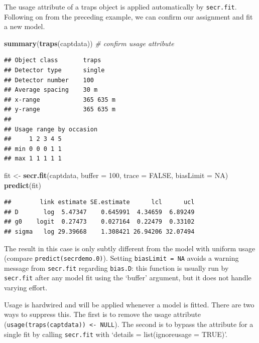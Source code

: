 \documentclass[
]{book}
\newenvironment{Shaded}{\begin{snugshade}}{\end{snugshade}}
\newcommand{\AttributeTok}[1]{\textcolor[rgb]{0.13,0.29,0.53}{#1}}
\newcommand{\CommentTok}[1]{\textcolor[rgb]{0.56,0.35,0.01}{\textit{#1}}}
\newcommand{\ConstantTok}[1]{\textcolor[rgb]{0.56,0.35,0.01}{#1}}
\newcommand{\DecValTok}[1]{\textcolor[rgb]{0.00,0.00,0.81}{#1}}
\newcommand{\FunctionTok}[1]{\textcolor[rgb]{0.13,0.29,0.53}{\textbf{#1}}}
\newcommand{\NormalTok}[1]{#1}
\newcommand{\OtherTok}[1]{\textcolor[rgb]{0.56,0.35,0.01}{#1}}
\begin{document}
The usage attribute of a traps object is applied automatically by \texttt{secr.fit}. Following on from the preceding example, we can confirm our assignment and fit a new model.

\begin{Shaded}
\begin{Highlighting}[]
\FunctionTok{summary}\NormalTok{(}\FunctionTok{traps}\NormalTok{(captdata))    }\CommentTok{\# confirm usage attribute}
\end{Highlighting}
\end{Shaded}

\begin{verbatim}
## Object class       traps 
## Detector type      single 
## Detector number    100 
## Average spacing    30 m 
## x-range            365 635 m 
## y-range            365 635 m 
## 
## Usage range by occasion
##     1 2 3 4 5
## min 0 0 0 1 1
## max 1 1 1 1 1
\end{verbatim}

\begin{Shaded}
\begin{Highlighting}[]
\NormalTok{fit }\OtherTok{\textless{}{-}} \FunctionTok{secr.fit}\NormalTok{(captdata, }\AttributeTok{buffer =} \DecValTok{100}\NormalTok{, }\AttributeTok{trace =} \ConstantTok{FALSE}\NormalTok{, }\AttributeTok{biasLimit =} \ConstantTok{NA}\NormalTok{)}
\FunctionTok{predict}\NormalTok{(fit)}
\end{Highlighting}
\end{Shaded}

\begin{verbatim}
##        link estimate SE.estimate      lcl      ucl
## D       log  5.47347    0.645991  4.34659  6.89249
## g0    logit  0.27473    0.027164  0.22479  0.33102
## sigma   log 29.39668    1.308421 26.94206 32.07494
\end{verbatim}

The result in this case is only subtly different from the model with uniform usage (compare \texttt{predict(secrdemo.0)}). Setting \texttt{biasLimit\ =\ NA} avoids a warning message from \texttt{secr.fit} regarding \texttt{bias.D}: this function is usually run by \texttt{secr.fit} after any model fit using the `buffer' argument, but it does not handle varying effort.

Usage is hardwired and will be applied whenever a model is fitted. There are two ways to suppress this. The first is to remove the usage attribute (\texttt{usage(traps(captdata))\ \textless{}-\ NULL}). The second is to bypass the attribute for a single fit by calling \texttt{secr.fit} with `details = list(ignoreusage = TRUE)'.
\end{document}
